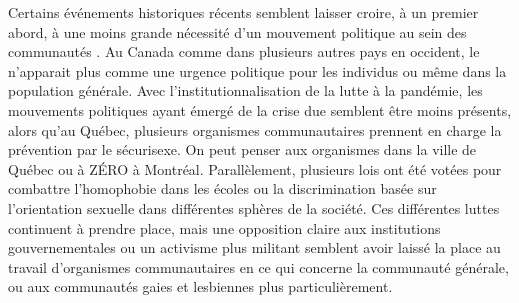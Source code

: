 Certains événements historiques récents semblent laisser croire, à un premier abord, à une moins grande nécessité d'un mouvement politique au sein des communautés \lgbt{}.
Au Canada comme dans plusieurs autres pays en occident, le \sida{} n'apparait plus comme une urgence politique pour les individus \lgbt{} ou même dans la population générale.
Avec l'institutionnalisation de la lutte à la pandémie, les mouvements politiques ayant émergé de la crise due \vih{} semblent être moins présents, alors qu'au Québec, plusieurs organismes communautaires prennent en charge la prévention par le sécurisexe.
On peut penser aux organismes \miels{} dans la ville de Québec ou à ZÉRO à Montréal.
Parallèlement, plusieurs lois ont été votées pour combattre l'homophobie dans les écoles ou la discrimination basée sur l'orientation sexuelle dans différentes sphères de la société.
Ces différentes luttes continuent à prendre place, mais une opposition claire aux institutions gouvernementales ou un activisme plus militant semblent avoir laissé la place au travail d'organismes communautaires en ce qui concerne la communauté \lgbt{} générale, ou aux communautés gaies et lesbiennes plus particulièrement.

